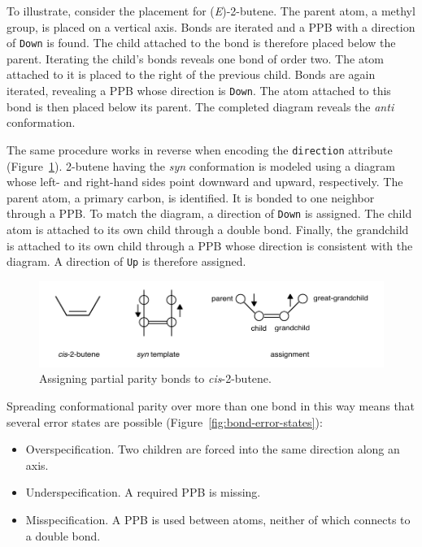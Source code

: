 \documentclass{article}
\def\ttt{\texttt}
\begin{document}
To illustrate, consider the placement for (\textit{E})-2-butene. The parent atom, a methyl group, is placed on a vertical axis. Bonds are iterated and a PPB with a direction of \ttt{Down} is found. The child attached to the bond is therefore placed below the parent. Iterating the child's bonds reveals one bond of order two. The atom attached to it is placed to the right of the previous child. Bonds are again iterated, revealing a PPB whose direction is \ttt{Down}. The atom attached to this bond is then placed below its parent. The completed diagram reveals the \textit{anti} conformation.

The same procedure works in reverse when encoding the \ttt{direction} attribute (Figure~\ref{fig:assigning-ppb}). 2-butene having the \textit{syn} conformation is modeled using a diagram whose left- and right-hand sides point downward and upward, respectively. The parent atom, a primary carbon, is identified. It is bonded to one neighbor through a PPB. To match the diagram, a direction of \ttt{Down} is assigned. The child atom is attached to its own child through a double bond. Finally, the grandchild is attached to its own child through a PPB whose direction is consistent with the diagram. A direction of \ttt{Up} is therefore assigned.

\begin{figure}
    \centering
    \includegraphics[width=\columnwidth]{assigning-ppbs.pdf}
    \caption{Assigning partial parity bonds to \textit{cis}-2-butene.}
    \label{fig:assigning-ppb}
\end{figure}

Spreading conformational parity over more than one bond in this way means that several error states are possible (Figure~\ref{fig:bond-error-states}):

\begin{itemize}
    \item{Overspecification. Two children are forced into the same direction along an axis.}
    \item{Underspecification. A required PPB is missing.}
    \item{ Misspecification. A PPB is used between atoms, neither of which connects to a double bond.}
\end{itemize}
\end{document}

